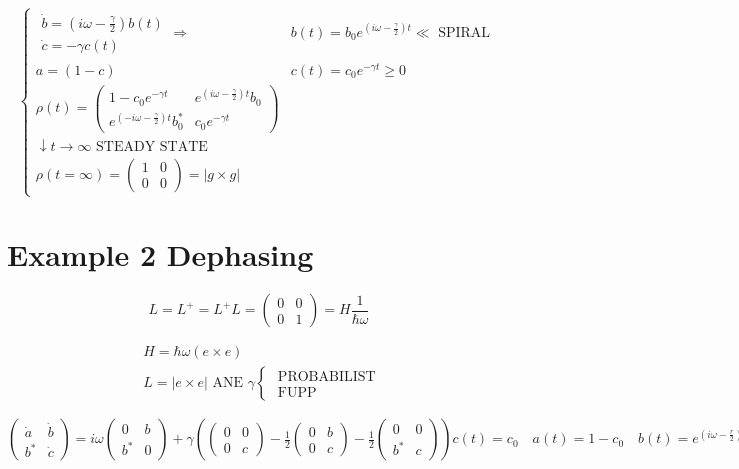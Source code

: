 \documentclass[10pt]{article}
\begin{document}
$$
\begin{cases}\begin{array}{l}
\dot{b}=\left(i \omega-\frac{\gamma}{2}\right) b(t) \\
\dot{c}=-\gamma c(t)
\end{array} \Rightarrow & b(t)=b_{0} e^{\left(i \omega-\frac{\gamma}{2}\right) t} \ll \text { SPIRAL } \\
a=(1-c) & c(t)=c_{0} e^{-\gamma t} \geqslant 0 \\
\rho(t)=\left(\begin{array}{cc}
1-c_{0} e^{-\gamma t} & e^{\left(i \omega-\frac{\gamma}{2}\right) t} b_{0} \\
e^{\left(-i \omega-\frac{\gamma}{2}\right) t} b_{0}^{*} & c_{0} e^{-\gamma t}
\end{array}\right) \\
\downarrow t \rightarrow \infty \text { STEADY STATE } \\
\rho(t=\infty)=\left(\begin{array}{ll}
1 & 0 \\
0 & 0
\end{array}\right)=|g \times g|\end{cases}
$$

\section*{Example 2 Dephasing}
$$
L=L^{+}=L^{+} L=\left(\begin{array}{ll}
0 & 0 \\
0 & 1
\end{array}\right)=H \frac{1}{\hbar \omega}
$$

$$
\begin{aligned}
& H=\hbar \omega(e \times e) \\
& L=|e \times e| \text { ANE } \gamma\left\{\begin{array}{l}
\text { PROBABILIST } \\
\text { FUPP }
\end{array}\right.
\end{aligned}
$$

$\left(\begin{array}{cc}\dot{a} & \dot{b} \\ b^{*} & \dot{c}\end{array}\right)=i \omega\left(\begin{array}{cc}0 & b \\ b^{*} & 0\end{array}\right)+\gamma\left(\left(\begin{array}{ll}0 & 0 \\ 0 & c\end{array}\right)-\frac{1}{2}\left(\begin{array}{ll}0 & b \\ 0 & c\end{array}\right)-\frac{1}{2}\left(\begin{array}{ll}0 & 0 \\ b^{*} & c\end{array}\right)\right) c(t)=c_{0} \quad a(t)=1-c_{0} \quad b(t)=e^{\left(i \omega-\frac{r}{2}\right) t} b_{0}$
\end{document}
